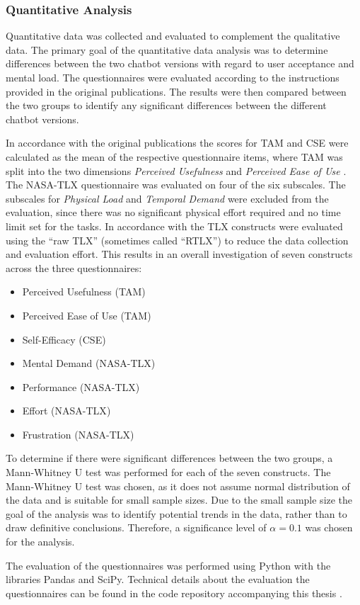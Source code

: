 \subsubsection{Quantitative Analysis} \label{sssec:quantitative_analysis}

Quantitative data was collected and evaluated to complement the qualitative data. The primary goal of the quantitative data analysis was to determine differences between the two chatbot versions with regard to user acceptance and mental load. The questionnaires were evaluated according to the instructions provided in the original publications. The results were then compared between the two groups to identify any significant differences between the different chatbot versions.

In accordance with the original publications the scores for TAM and CSE were calculated as the mean of the respective questionnaire items, where TAM was split into the two dimensions \textit{Perceived Usefulness} and \textit{Perceived Ease of Use} \parencite{Davis1989,Compeau1995}. The \acs{NASA}-\ac{TLX} questionnaire was evaluated on four of the six subscales. The subscales for \textit{Physical Load} and \textit{Temporal Demand} were excluded from the evaluation, since there was no significant physical effort required and no time limit set for the tasks. In accordance with \cite{Hart2006} the \ac{TLX} constructs were evaluated using the “raw TLX” (sometimes called “RTLX”) to reduce the data collection and evaluation effort. This results in an overall investigation of seven constructs across the three questionnaires:

\begin{itemize}
    \item Perceived Usefulness (\ac{TAM})
    \item Perceived Ease of Use (\ac{TAM})
    \item Self-Efficacy (\ac{CSE})
    \item Mental Demand (\acs{NASA}-\ac{TLX})
    \item Performance (\acs{NASA}-\ac{TLX})
    \item Effort (\acs{NASA}-\ac{TLX})
    \item Frustration (\acs{NASA}-\ac{TLX})
\end{itemize}

To determine if there were significant differences between the two groups, a Mann-Whitney U test was performed for each of the seven constructs. The Mann-Whitney U test was chosen, as it does not assume normal distribution of the data and is suitable for small sample sizes. Due to the small sample size the goal of the analysis was to identify potential trends in the data, rather than to draw definitive conclusions. Therefore, a significance level of $\alpha = 0.1$ was chosen for the analysis.

The evaluation of the questionnaires was performed using Python with the libraries Pandas and SciPy. Technical details about the evaluation the questionnaires can be found in the code repository accompanying this thesis \parencite{Goepfert2025}.
